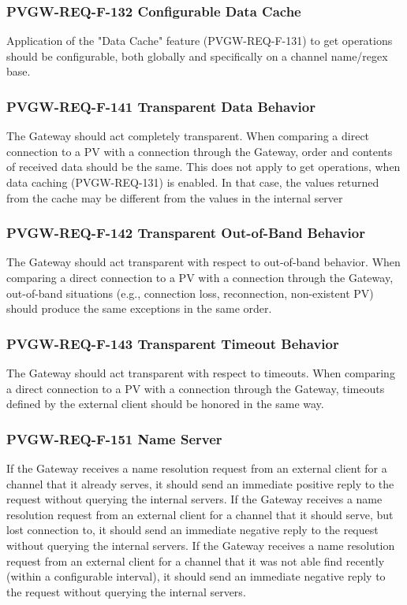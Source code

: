 \documentclass[11pt
  , a4paper
  , article
  , oneside
]{memoir}
\begin{document}
\subsubsection{PVGW-REQ-F-132 Configurable Data Cache}
Application of the "Data Cache" feature (PVGW-REQ-F-131) to get operations should be configurable, both globally and specifically on a channel name/regex base.

\subsubsection{PVGW-REQ-F-141 Transparent Data Behavior}
The Gateway should act completely transparent. When comparing a direct connection to a PV with a connection through the Gateway, order and contents of received data should be the same.
This does not apply to get operations, when data caching (PVGW-REQ-131) is enabled. In that case, the values returned from the cache may be different from the values in the internal server

\subsubsection{PVGW-REQ-F-142 Transparent Out-of-Band Behavior}
The Gateway should act transparent with respect to out-of-band behavior. When comparing a direct connection to a PV with a connection through the Gateway, out-of-band situations (e.g., connection loss, reconnection, non-existent PV) should produce the same exceptions in the same order.

\subsubsection{PVGW-REQ-F-143 Transparent Timeout Behavior}
The Gateway should act transparent with respect to timeouts. When comparing a direct connection to a PV with a connection through the Gateway, timeouts defined by the external client should be honored in the same way.

\subsubsection{PVGW-REQ-F-151 Name Server}
If the Gateway receives a name resolution request from an external client for a channel that it already serves, it should send an immediate positive reply to the request without querying the internal servers. If the Gateway receives a name resolution request from an external client for a channel that it should serve, but lost connection to, it should send an immediate negative reply to the request without querying the internal servers. If the Gateway receives a name resolution request from an external client for a channel that it was not able find recently (within a configurable interval), it should send an immediate negative reply to the request without querying the internal servers.
\end{document}
